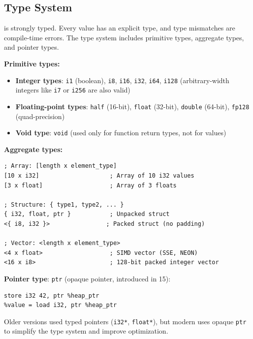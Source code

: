 \subsection{Type System}
\label{sec:type-system}

  is strongly typed. Every value has an explicit type, and type mismatches are compile-time errors. The type system includes primitive types, aggregate types, and pointer types.

\textbf{Primitive types:}

\begin{itemize}[noitemsep]
  \item \textbf{Integer types}: \texttt{i1} (boolean), \texttt{i8}, \texttt{i16}, \texttt{i32}, \texttt{i64}, \texttt{i128} (arbitrary-width integers like \texttt{i7} or \texttt{i256} are also valid)
  \item \textbf{Floating-point types}: \texttt{half} (16-bit), \texttt{float} (32-bit), \texttt{double} (64-bit), \texttt{fp128} (quad-precision)
  \item \textbf{Void type}: \texttt{void} (used only for function return types, not for values)
\end{itemize}

\textbf{Aggregate types:}

\begin{lstlisting}[style=ir]
; Array: [length x element_type]
[10 x i32]                    ; Array of 10 i32 values
[3 x float]                   ; Array of 3 floats

; Structure: { type1, type2, ... }
{ i32, float, ptr }           ; Unpacked struct
<{ i8, i32 }>                ; Packed struct (no padding)

; Vector: <length x element_type>
<4 x float>                   ; SIMD vector (SSE, NEON)
<16 x i8>                     ; 128-bit packed integer vector
\end{lstlisting}

\textbf{Pointer type}: \texttt{ptr} (opaque pointer, introduced in  15):

\begin{lstlisting}[style=ir]
%heap_ptr = call ptr @malloc(i64 64)
store i32 42, ptr %heap_ptr
%value = load i32, ptr %heap_ptr
\end{lstlisting}

Older  versions used typed pointers (\texttt{i32*}, \texttt{float*}), but modern  uses opaque \texttt{ptr} to simplify the type system and improve optimization.

